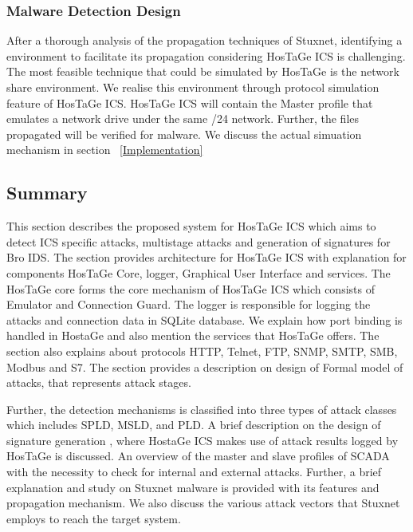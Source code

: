 \documentclass[article,msc=informatik,type=msc,colorback,accentcolor=tud9c]{tudthesis}
\begin{document}
	\subsubsection{Malware Detection Design}\label{Malware Detection Design}
	After a thorough analysis of the propagation techniques of Stuxnet, identifying a environment to facilitate its propagation considering HosTaGe ICS is challenging. The most feasible technique that could be simulated by HosTaGe is the network share environment. We realise this environment through protocol simulation feature of HosTaGe ICS. HosTaGe ICS will contain the Master profile that emulates a network drive under the same /24 network. Further, the files propagated will be verified for malware. We discuss the actual simuation mechanism in section ~\ref{Implementation} 
	
	
	\subsection{Summary}
	This section describes the proposed system for HosTaGe ICS which aims to detect \ac{ICS} specific attacks, multistage attacks and generation of signatures for Bro \ac{IDS}. The section provides architecture for HosTaGe ICS with explanation for components HosTaGe Core, logger, Graphical User Interface and services. The HosTaGe core forms the core mechanism of HosTaGe ICS which consists of Emulator and Connection Guard. The logger is responsible for logging the attacks and connection data in SQLite database. We explain how port binding is handled in HostaGe and also mention the services that HosTaGe offers. The section also explains about protocols HTTP, Telnet, FTP, SNMP, SMTP, SMB, Modbus and S7. The section provides a description on design of Formal model of attacks, that represents attack stages. 
	
	
	\vspace{3mm}
	Further, the detection mechanisms is classified into three types of attack classes which includes \ac{SPLD}, \ac{MSLD}, and \ac{PLD}. A brief description on the design of signature generation , where HostaGe ICS makes use of attack results logged by HosTaGe is discussed. An overview of the master and slave profiles of \ac{SCADA} with the necessity to check for internal and external attacks. Further,  a brief explanation and study on Stuxnet malware is provided with its features and propagation mechanism. We also discuss the various attack vectors that Stuxnet employs to reach the target system.
	
\end{document}
